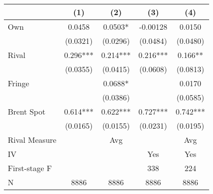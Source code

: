 {
\def\sym#1{\ifmmode^{#1}\else\(^{#1}\)\fi}
\begin{tabular}{l*{4}{c}}
\toprule
                &\multicolumn{1}{c}{(1)}   &\multicolumn{1}{c}{(2)}   &\multicolumn{1}{c}{(3)}   &\multicolumn{1}{c}{(4)}   \\
\midrule
Own             &   0.0458   &   0.0503*  & -0.00128   &   0.0150   \\
                & (0.0321)   & (0.0296)   & (0.0484)   & (0.0480)   \\
\addlinespace
Rival           &    0.296***&    0.214***&    0.216***&    0.166** \\
                & (0.0355)   & (0.0415)   & (0.0608)   & (0.0813)   \\
\addlinespace
Fringe          &            &   0.0688*  &            &   0.0170   \\
                &            & (0.0386)   &            & (0.0585)   \\
\addlinespace
Brent Spot      &    0.614***&    0.622***&    0.727***&    0.742***\\
                & (0.0165)   & (0.0155)   & (0.0231)   & (0.0195)   \\
\midrule
Rival Measure   &            &      Avg   &            &      Avg   \\
IV              &            &            &      Yes   &      Yes   \\
First-stage F   &            &            &      338   &      224   \\
N               &     8886   &     8886   &     8886   &     8886   \\
\bottomrule
\end{tabular}
}
